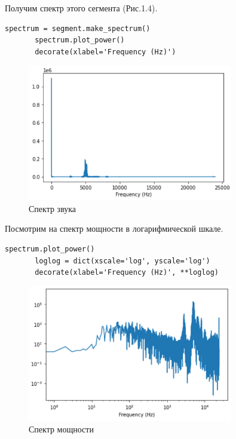 \documentclass[a4paper,12pt]{report}
\begin{document}
    Получим спектр этого сегмента (Рис.1.4).
\begin{lstlisting}[caption=Получение спектра]
       spectrum = segment.make_spectrum()
       spectrum.plot_power()
       decorate(xlabel='Frequency (Hz)')
\end{lstlisting}
\begin{figure}[H]
        \centering
        \includegraphics[width=0.8\textwidth]{fig1-4.PNG}
        \caption{Спектр звука}
        \label{fig:fig1-4}
\end{figure} 
    
    Посмотрим на спектр мощности в логарифмической шкале.
\begin{lstlisting}[caption=Получение спектра в логарифмической шкале]
       spectrum.plot_power()
       loglog = dict(xscale='log', yscale='log')
       decorate(xlabel='Frequency (Hz)', **loglog)
\end{lstlisting}
\begin{figure}[H]
        \centering
        \includegraphics[width=0.8\textwidth]{fig1-5.PNG}
        \caption{Спектр мощности}
        \label{fig:fig1-5}
\end{figure}
    
\end{document}
